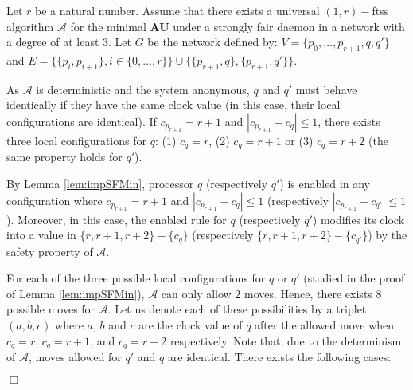 \documentclass[11pt,english,letterpaper]{article}
\newenvironment{proof}{{\noindent\bf Proof. } }{{\hfill $\Box$}}
\begin{document}
\begin{proof}
Let $r$ be a natural number. Assume that there exists a universal $(1,r)-$ftss algorithm $\mathcal{A}$ for the minimal \textbf{AU} under a strongly fair daemon in a network with a degree of at least 3. Let $G$ be the network defined by: $V=\{p_{0},\ldots,p_{r+1},q,q'\}$ and $E=\{\{p_{i},p_{i+1}\},i\in\{0,\ldots,r\}\}\cup\{\{p_{r+1},q\},\{p_{r+1},q'\}\}$.

As $\mathcal{A}$ is deterministic and the system anonymous, $q$ and $q'$ must behave identically if they have the same clock value (in this case, their local configurations are identical). If $c_{p_{r+1}}=r+1$ and $|c_{p_{r+1}}-c_{q}|\leq 1$, there exists three local configurations for $q$: (1) $c_{q}=r$, (2) $c_{q}=r+1$ or (3) $c_{q}=r+2$ (the same property holds for $q'$).

By Lemma \ref{lem:impSFMin}, processor $q$ (respectively $q'$) is enabled in any configuration where $c_{p_{r+1}}=r+1$ and $|c_{p_{r+1}}-c_{q}|\leq 1$ (respectively $|c_{p_{r+1}}-c_{q'}|\leq 1$). Moreover, in this case, the enabled rule for $q$ (respectively $q'$) modifies its clock into a value in $\{r,r+1,r+2\}-\{c_{q}\}$ (respectively $\{r,r+1,r+2\}-\{c_{q'}\}$) by the safety property of $\mathcal{A}$.

For each of the three possible local configurations for $q$ or $q'$ (studied in the proof of Lemma \ref{lem:impSFMin}), $\mathcal{A}$ can only allow $2$ moves. Hence, there exists $8$ possible moves for $\mathcal{A}$. Let us denote each of these possibilities by a triplet $(a,b,c)$ where $a$, $b$ and $c$ are the clock value of $q$ after the allowed move when $c_{q}=r$, $c_{q}=r+1$, and $c_{q}=r+2$ respectively. Note that, due to the determinism of $\mathcal{A}$, moves allowed for $q'$ and $q$ are identical. There exists the following cases:


\end{proof}
\end{document}
